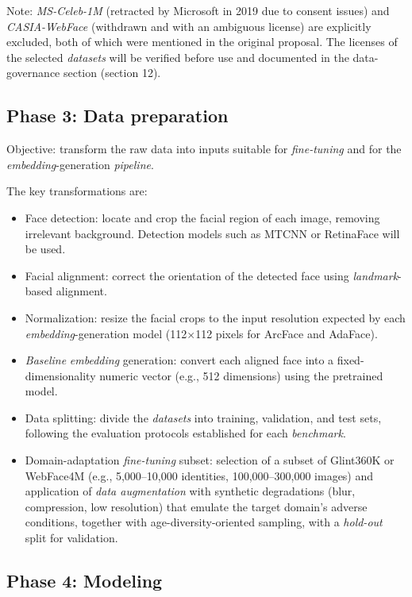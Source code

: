 \documentclass[
  11pt, %
]{charter}
\begin{document}
Note: \textit{MS-Celeb-1M} (retracted by Microsoft in 2019 due to consent issues) and \textit{CASIA-WebFace} (withdrawn and with an ambiguous license) are explicitly excluded, both of which were mentioned in the original proposal. The licenses of the selected \textit{datasets} will be verified before use and documented in the data-governance section (section 12).

\subsection{Phase 3: Data preparation}

Objective: transform the raw data into inputs suitable for \textit{fine-tuning} and for the \textit{embedding}-generation \textit{pipeline}.

The key transformations are:

\begin{itemize}
  \item Face detection: locate and crop the facial region of each image, removing irrelevant background. Detection models such as MTCNN or RetinaFace will be used.
  \item Facial alignment: correct the orientation of the detected face using \textit{landmark}-based alignment.
  \item Normalization: resize the facial crops to the input resolution expected by each \textit{embedding}-generation model (112$\times$112 pixels for ArcFace and AdaFace).
  \item \textit{Baseline} \textit{embedding} generation: convert each aligned face into a fixed-dimensionality numeric vector (e.g., 512 dimensions) using the pretrained model.
  \item Data splitting: divide the \textit{datasets} into training, validation, and test sets, following the evaluation protocols established for each \textit{benchmark}.
  \item Domain-adaptation \textit{fine-tuning} subset: selection of a subset of Glint360K or WebFace4M (e.g., 5,000--10,000 identities, 100,000--300,000 images) and application of \textit{data augmentation} with synthetic degradations (blur, compression, low resolution) that emulate the target domain's adverse conditions, together with age-diversity-oriented sampling, with a \textit{hold-out} split for validation.
\end{itemize}

\subsection{Phase 4: Modeling}
\end{document}
